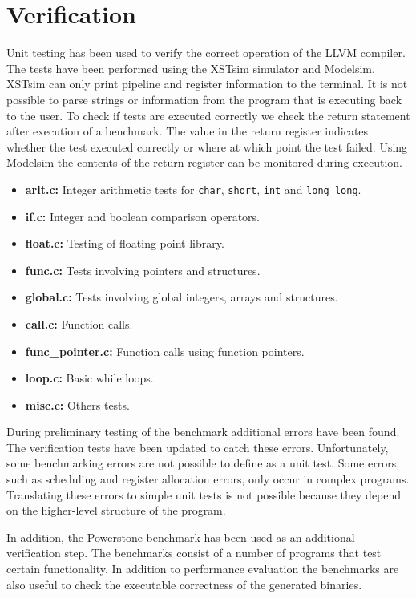 \section{Verification}
Unit testing has been used to verify the correct operation of the LLVM compiler. The tests have been performed using the XSTsim simulator and Modelsim. XSTsim can only print pipeline and register information to the terminal. It is not possible to parse strings or information from the program that is executing back to the user. To check if tests are executed correctly we check the return statement after execution of a benchmark. The value in the return register indicates whether the test executed correctly or where at which point the test failed. Using Modelsim the contents of the return register can be monitored during execution.

\begin{itemize}
	\item \textbf{arit.c:} Integer arithmetic tests for \texttt{char}, \texttt{short}, \texttt{int} and \texttt{long long}.
	\item \textbf{if.c:} Integer and boolean comparison operators.
	\item \textbf{float.c:} Testing of floating point library.
	\item \textbf{func.c:} Tests involving pointers and structures.
	\item \textbf{global.c:}  Tests involving global integers, arrays and structures.
	\item \textbf{call.c:} Function calls.
	\item \textbf{func\_pointer.c:} Function calls using function pointers.
	\item \textbf{loop.c:} Basic while loops.
	\item \textbf{misc.c:} Others tests.
\end{itemize}

During preliminary testing of the benchmark additional errors have been found. The verification tests have been updated to catch these errors. Unfortunately, some benchmarking errors are not possible to define as a unit test. Some errors, such as scheduling and register allocation errors, only occur in complex programs. Translating these errors to simple unit tests is not possible because they depend on the higher-level structure of the program.

In addition, the Powerstone benchmark \cite{Jeff-Scott:1998fj} has been used as an additional verification step. The benchmarks consist of a number of programs that test certain functionality. In addition to performance evaluation the benchmarks are also useful to check the executable correctness of the generated binaries.

